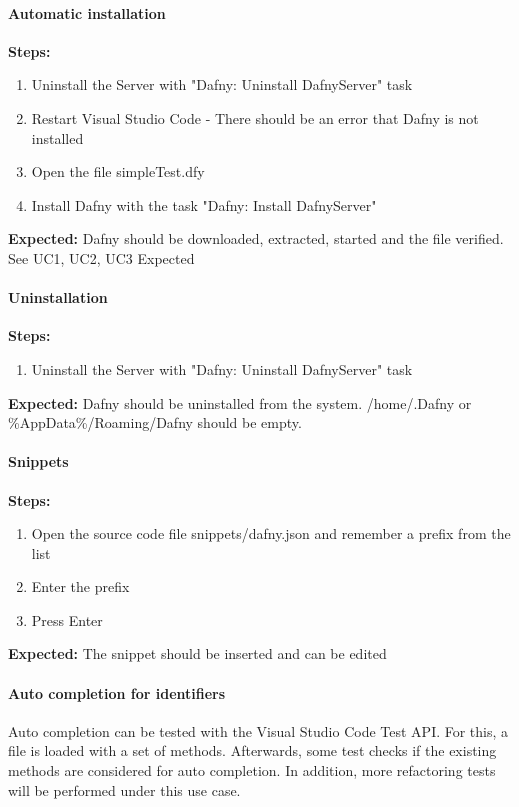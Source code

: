 \paragraph{Automatic installation}
\textbf{\newline Steps:}
\begin{enumerate}
	\item Uninstall the Server with "Dafny: Uninstall DafnyServer" task
	\item Restart Visual Studio Code - There should be an error that Dafny is not installed
	\item Open the file simpleTest.dfy
	\item Install Dafny with the task "Dafny: Install DafnyServer" 
\end{enumerate}
\textbf{\newline Expected:}
Dafny should be downloaded, extracted, started and the file verified. See UC1, UC2, UC3 Expected

\paragraph{Uninstallation}
\textbf{\newline Steps:}
\begin{enumerate}
	\item Uninstall the Server with "Dafny: Uninstall DafnyServer" task
\end{enumerate}
\textbf{\newline Expected:}
Dafny should be uninstalled from the system. /home/.Dafny or \%AppData\%/Roaming/Dafny should be empty.

\paragraph{Snippets}
\textbf{\newline Steps:}
\begin{enumerate}
	\item Open the source code file snippets/dafny.json and remember a prefix from the list
	\item Enter the prefix 
	\item Press Enter
\end{enumerate}
\textbf{\newline Expected:}
The snippet should be inserted and can be edited

\paragraph{Auto completion for identifiers}
Auto completion can be tested with the Visual Studio Code Test API. For this, a file is loaded with a set of methods. Afterwards, some test checks if the existing methods are considered for auto completion. In addition, more refactoring tests will be performed under this use case. 
